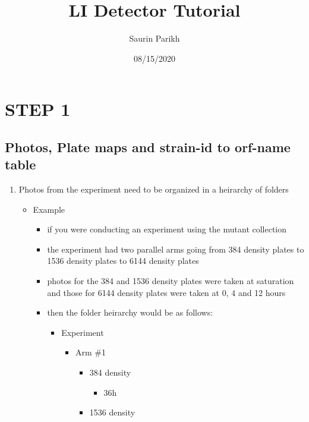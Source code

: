 \documentclass[]{article}
\title{LI Detector Tutorial}
\author{Saurin Parikh}
\date{08/15/2020}
\providecommand{\tightlist}{%
  \setlength{\itemsep}{0pt}\setlength{\parskip}{0pt}}
\begin{document}
\maketitle

{
\setcounter{tocdepth}{2}
\tableofcontents
}
\section{STEP 1}\label{step-1}

\subsection{Photos, Plate maps and strain-id to orf-name
table}\label{photos-plate-maps-and-strain-id-to-orf-name-table}

\begin{enumerate}
\def\labelenumi{\arabic{enumi}.}
\tightlist
\item
  Photos from the experiment need to be organized in a heirarchy of
  folders

  \begin{itemize}
  \tightlist
  \item
    Example

    \begin{itemize}
    \tightlist
    \item
      if you were conducting an experiment using the mutant collection
    \item
      the experiment had two parallel arms going from 384 density plates
      to 1536 density plates to 6144 density plates
    \item
      photos for the 384 and 1536 density plates were taken at
      saturation and those for 6144 density plates were taken at 0, 4
      and 12 hours
    \item
      then the folder heirarchy would be as follows:

      \begin{itemize}
      \tightlist
      \item
        Experiment

        \begin{itemize}
        \tightlist
        \item
          Arm \#1

          \begin{itemize}
          \tightlist
          \item
            384 density

            \begin{itemize}
            \tightlist
            \item
              36h
            \end{itemize}
          \item
            1536 density


\end{itemize}
\end{itemize}
\end{itemize}
\end{itemize}
\end{itemize}
\end{enumerate}
\end{document}
